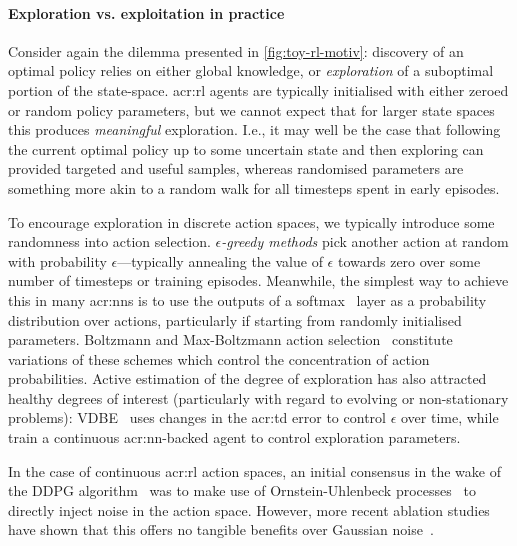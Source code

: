 \paragraph{Exploration vs. exploitation in practice}
Consider again the dilemma presented in \cref{fig:toy-rl-motiv}: discovery of an optimal policy relies on either global knowledge, or \emph{exploration} of a suboptimal portion of the state-space.
\gls{acr:rl} agents are typically initialised with either zeroed or random policy parameters, but we cannot expect that for larger state spaces this produces \emph{meaningful} exploration.
I.e., it may well be the case that following the current optimal policy up to some uncertain state and then exploring can provided targeted and useful samples, whereas randomised parameters are something more akin to a random walk for all timesteps spent in early episodes.

To encourage exploration in discrete action spaces, we typically introduce some randomness into action selection.
\emph{$\epsilon$-greedy methods} pick another action at random with probability $\epsilon$---typically annealing the value of $\epsilon$ towards zero over some number of timesteps or training episodes.
Meanwhile, the simplest way to achieve this in many \glspl{acr:nn} is to use the outputs of a softmax~\parencite{luce-softmax} layer as a probability distribution over actions, particularly if starting from randomly initialised parameters.
Boltzmann and Max-Boltzmann action selection~\parencite[pp. 73]{WieringMThesisRLExploration} constitute variations of these schemes which control the concentration of action probabilities.
Active estimation of the degree of exploration has also attracted healthy degrees of interest (particularly with regard to evolving or non-stationary problems): VDBE~\parencite{DBLP:conf/ki/Tokic10,DBLP:conf/ki/TokicP11} uses changes in the \gls{acr:td} error to control $\epsilon$ over time, while \textcite{DBLP:conf/annpr/TokicP12} train a continuous \gls{acr:nn}-backed agent to control exploration parameters.

In the case of continuous \gls{acr:rl} action spaces, an initial consensus in the wake of the DDPG algorithm~\parencite{DBLP:journals/corr/LillicrapHPHETS15} was to make use of Ornstein-Uhlenbeck processes~\parencite{PhysRev.36.823} to directly inject noise in the action space.
However, more recent ablation studies have shown that this offers no tangible benefits over Gaussian noise~\parencite{DBLP:conf/icml/FujimotoHM18,DBLP:conf/iclr/Barth-MaronHBDH18}.

